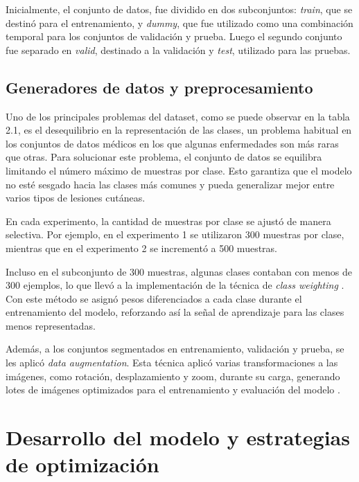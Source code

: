 Inicialmente, el conjunto de datos, fue dividido en dos subconjuntos: \textit{train}, que se destinó para el entrenamiento, y \textit{dummy}, que fue utilizado como una combinación temporal para los conjuntos de validación y prueba. Luego el segundo conjunto fue separado en \textit{valid}, destinado a la validación y \textit{test}, utilizado para las pruebas.

\subsection{Generadores de datos y preprocesamiento}

Uno de los principales problemas del dataset, como se puede observar en la tabla 2.1, es el desequilibrio en la representación de las clases, un problema habitual en los conjuntos de datos médicos en los que algunas enfermedades son más raras que otras. Para solucionar este problema, el conjunto de datos se equilibra limitando el número máximo de muestras por clase. Esto garantiza que el modelo no esté sesgado hacia las clases más comunes y pueda generalizar mejor entre varios tipos de lesiones cutáneas. 

En cada experimento, la cantidad de muestras por clase se ajustó de manera selectiva. Por ejemplo, en el experimento 1 se utilizaron 300 muestras por clase, mientras que en el experimento 2 se incrementó a 500 muestras. 

Incluso en el subconjunto de 300 muestras, algunas clases contaban con menos de 300 ejemplos, lo que llevó a la implementación de la técnica de \textit{class weighting} . Con este método se asignó pesos diferenciados a cada clase durante el entrenamiento del modelo, reforzando así la señal de aprendizaje para las clases menos representadas.

Además, a los conjuntos segmentados en entrenamiento, validación y prueba, se les aplicó \textit{data augmentation}. Esta técnica aplicó varias transformaciones a las imágenes, como rotación, desplazamiento y zoom, durante su carga, generando lotes de imágenes optimizados para el entrenamiento y evaluación del modelo .

\section{Desarrollo del modelo y estrategias de optimización}\label{sec:method}

